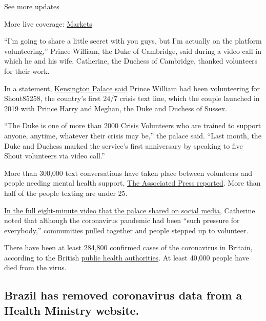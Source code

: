 \href{https://www.nytimes3xbfgragh.onion/2020/08/20/world/coronavirus-covid.html?action=click\&pgtype=Article\&state=default\&region=MAIN_CONTENT_1\&context=storylines_live_updates}{See
more updates}

More live coverage:
\href{https://www.nytimes3xbfgragh.onion/live/2020/08/20/business/stock-market-today-coronavirus?action=click\&pgtype=Article\&state=default\&region=MAIN_CONTENT_1\&context=storylines_live_updates}{Markets}

``I'm going to share a little secret with you guys, but I'm actually on
the platform volunteering,'' Prince William, the Duke of Cambridge, said
during a video call in which he and his wife, Catherine, the Duchess of
Cambridge, thanked volunteers for their work.

In a statement,
\href{https://www.royal.uk/duke-and-duchess-cambridge-thank-volunteers}{Kensington
Palace said} Prince William had been volunteering for Shout85258, the
country's first 24/7 crisis text line, which the couple launched in 2019
with Prince Harry and Meghan, the Duke and Duchess of Sussex.

``The Duke is one of more than 2000 Crisis Volunteers who are trained to
support anyone, anytime, whatever their crisis may be,'' the palace
said. ``Last month, the Duke and Duchess marked the service's first
anniversary by speaking to five Shout volunteers via video call.''

More than 300,000 text conversations have taken place between volunteers
and people needing mental health support,
\href{https://apnews.com/526a713bd3d291c9023ed2f61cd64e41}{The
Associated Press reported}. More than half of the people texting are
under 25.

\href{https://www.youtube.com/watch?v=tGdL9zfdE1Q}{In the full
eight-minute video that the palace shared on social media}, Catherine
noted that although the coronavirus pandemic had been ``such pressure
for everybody,'' communities pulled together and people stepped up to
volunteer.

There have been at least 284,800 confirmed cases of the coronavirus in
Britain, according to the British
\href{https://coronavirus.data.gov.uk/}{public health authorities}. At
least 40,000 people have died from the virus.

\hypertarget{brazil-has-removed-coronavirus-data-from-a-health-ministry-website}{%
\subsection{Brazil has removed coronavirus data from a Health Ministry
website.}\label{brazil-has-removed-coronavirus-data-from-a-health-ministry-website}}

